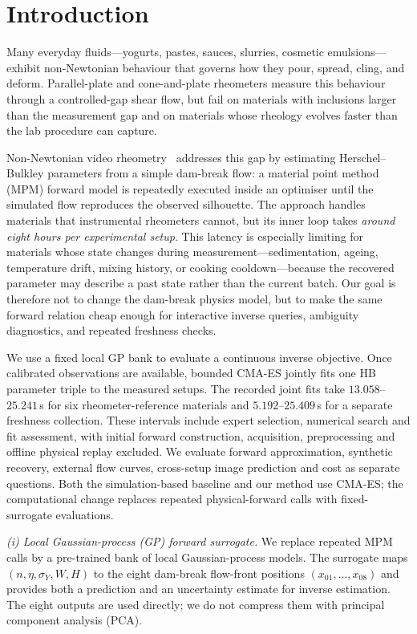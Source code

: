 \section{Introduction}

Many everyday fluids---yogurts, pastes, sauces, slurries, cosmetic
emulsions---exhibit non-Newtonian behaviour that governs how they
pour, spread, cling, and deform. Parallel-plate and cone-and-plate
rheometers measure this behaviour through a controlled-gap shear
flow, but fail on materials with inclusions larger than the
measurement gap and on materials whose rheology evolves faster than
the lab procedure can capture.

Non-Newtonian video rheometry~\cite{hamamichi2023nonnewtonian}
addresses this gap by estimating Herschel--Bulkley parameters
from a simple dam-break flow: a material point
method (MPM) forward model is repeatedly executed inside an optimiser
until the simulated flow reproduces the observed silhouette. The
approach handles materials that instrumental rheometers cannot, but its
inner loop takes \emph{around eight hours per experimental setup}. This
latency is especially limiting for materials whose state changes during
measurement---sedimentation, ageing, temperature drift, mixing history,
or cooking cooldown---because the recovered parameter may describe a
past state rather than the current batch. Our goal is therefore not to
change the dam-break physics model, but to make the same forward
relation cheap enough for interactive inverse queries, ambiguity
diagnostics, and repeated freshness checks.

We use a fixed local GP bank to evaluate a continuous inverse objective.
Once calibrated observations are available, bounded CMA-ES jointly fits
one HB parameter triple to the measured setups. The recorded joint fits
take $13.058$--$25.241$\,s for six rheometer-reference materials and
$5.192$--$25.409$\,s for a separate freshness collection. These intervals
include expert selection, numerical search and fit assessment, with
initial forward construction, acquisition, preprocessing and offline
physical replay excluded. We evaluate forward approximation, synthetic
recovery, external flow curves, cross-setup image prediction and cost
as separate questions. Both the simulation-based baseline and our method
use CMA-ES; the computational change replaces repeated physical-forward
calls with fixed-surrogate evaluations.

\emph{(i) Local Gaussian-process (GP) forward surrogate.}
We replace repeated MPM calls by a pre-trained bank of local
Gaussian-process models. The surrogate maps
$(n,\eta,\sigma_Y,W,H)$ to the eight dam-break flow-front positions
$(x_{01},\ldots,x_{08})$ and provides both a prediction and an
uncertainty estimate for inverse estimation. The eight outputs are used
directly; we do not compress them with principal component analysis
(PCA).

